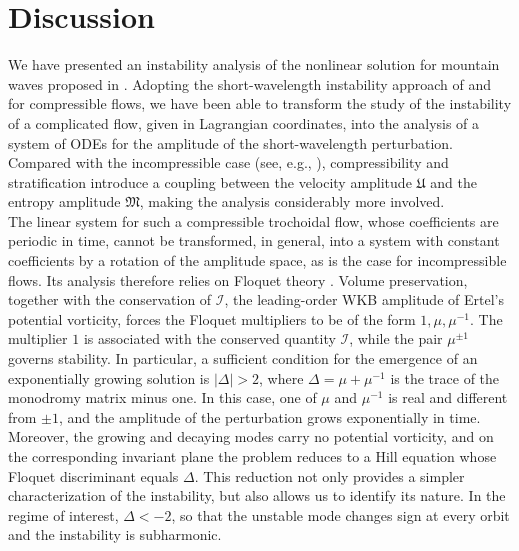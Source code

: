 \documentclass[reqno]{amsart}
\newcommand{\A}{\boldsymbol{\mathfrak{U}}}              %
\newcommand{\B}{{\mathfrak{M}}}
\begin{document}
\section{Discussion}\label{discussion}
We have presented an instability analysis of the nonlinear solution for mountain waves proposed in \cite{ConstantinMountain2023}. Adopting the short-wavelength instability approach of \cite{LH} and \cite{LebovitzL} for compressible flows, we have been able to transform the study of the instability of a complicated flow, given in Lagrangian coordinates, into the analysis of a system of ODEs for the amplitude of the short-wavelength perturbation. Compared with the incompressible case (see, e.g., \cite{CG,Kruse,Kruse2,mioInstability}), compressibility and stratification introduce a coupling between the velocity amplitude $\A$ and the entropy amplitude $\B$, making the analysis considerably more involved.\\
The linear system for such a compressible trochoidal flow, whose coefficients are periodic in time, cannot be transformed, in general, into a system with constant coefficients by a rotation of the amplitude space, as is the case for incompressible flows. Its analysis therefore relies on Floquet theory \cite{YakubovichStarzhinskii1975}. Volume preservation, together with the conservation of $\mathcal I$, the leading-order WKB amplitude of Ertel's potential vorticity, forces the Floquet multipliers to be of the form ${1,\mu,\mu^{-1}}$. The multiplier $1$ is associated with the conserved quantity $\mathcal I$, while the pair $\mu^{\pm1}$ governs stability. In particular, a sufficient condition for the emergence of an exponentially growing solution is $|\Delta|>2$, where $\Delta=\mu+\mu^{-1}$ is the trace of the monodromy matrix minus one. In this case, one of $\mu$ and $\mu^{-1}$ is real and different from $\pm1$, and the amplitude of the perturbation grows exponentially in time.\\
Moreover, the growing and decaying modes carry no potential vorticity, and on the corresponding invariant plane the problem reduces to a Hill equation whose Floquet discriminant equals $\Delta$. This reduction not only provides a simpler characterization of the instability, but also allows us to identify its nature. In the regime of interest, $\Delta<-2$, so that the unstable mode changes sign at every orbit and the instability is subharmonic. \\
\end{document}
